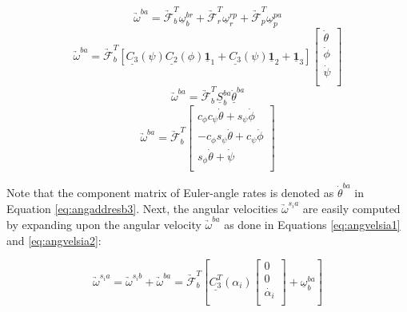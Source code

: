 \documentclass[journal]{IEEEtran}
\begin{document}
\begin{equation}
	\underrightarrow{\omega}^{ba}=\underrightarrow{\mathcal{F}}^T_b\underline{\omega}^{br}_b+\underrightarrow{\mathcal{F}}^T_r\underline{\omega}^{rp}_r+\underrightarrow{\mathcal{F}}^T_p\underline{\omega}^{pa}_p
	\label{eq:angaddresb1}
\end{equation}
\begin{equation}
\underrightarrow{\omega}^{ba}=\underrightarrow{\mathcal{F}}^T_b[\underline{C_3}(\psi)\underline{C_2}(\phi)\underline{\mathbf{1}}_1+\underline{C_3}(\psi)\underline{\mathbf{1}}_2+\underline{\mathbf{1}}_3]	\left[ \begin{array}{c}
	\dot{\theta}  \\
	\dot{\phi}  \\
	\dot{\psi} \\
	\end{array} \right]
\label{eq:angaddresb2}
\end{equation}
\begin{equation}
\underrightarrow{\omega}^{ba}=\underrightarrow{\mathcal{F}}^T_b
\underline{S}^{ba}_b\underline{\dot{\theta}}^{ba}	
\label{eq:angaddresb3}
\end{equation}
\begin{equation}
\underrightarrow{\omega}^{ba}=\underrightarrow{\mathcal{F}}^T_b
	\left[ \begin{array}{c}
	c_{\phi}c_{\psi}\dot{\theta}+s_{\psi}\dot{\phi}  \\
	-c_{\phi}s_{\psi}\dot{\theta}+c_{\psi}\dot{\phi}  \\
	s_{\phi}\dot{\theta}+\dot{\psi} \\
	\end{array} \right]
\label{eq:angaddresb4}
\end{equation}

Note that the component matrix of Euler-angle rates is denoted as $\dot{\theta}^{ba}$ in Equation \ref{eq:angaddresb3}. Next, the angular velocities $\underrightarrow{\omega}^{s_ia}$ are easily computed by expanding upon the angular velocity $\underrightarrow{\omega}^{ba}$ as done in Equations \ref{eq:angvelsia1} and \ref{eq:angvelsia2}:

\begin{equation}
\underrightarrow{\omega}^{s_ia}=\underrightarrow{\omega}^{s_ib}+\underrightarrow{\omega}^{ba}=\underrightarrow{\mathcal{F}}^T_b[\underline{C^T_3}(\alpha_i)\left[ \begin{array}{c}
	0  \\
	0 \\
	\dot{\alpha_i} \\
	\end{array} \right]+\underline{\omega}^{ba}_b]
\label{eq:angvelsia1}
\end{equation} 
\end{document}

